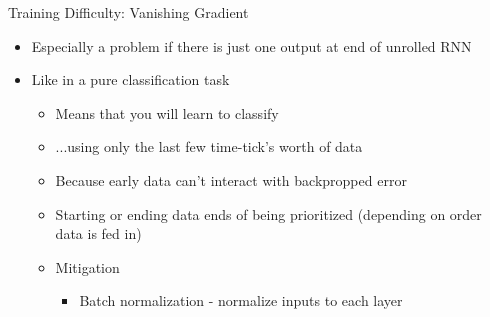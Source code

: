 \documentclass[aspectratio=169]{beamer}
\begin{document}
\begin{frame}{Training Difficulty: Vanishing Gradient}

\begin{itemize}
	\item Especially a problem if there is just one output at end of unrolled RNN
	\item Like in a pure classification task
	\begin{itemize}
	\item Means that you will learn to classify
	\item ...using only the last few time-tick's worth of data
	\item Because early data can't interact with backpropped error
	\item Starting or ending data ends of being prioritized (depending on order data is fed in)
	\item Mitigation
		\begin{itemize}
		\item Batch normalization - normalize inputs to each layer
		\end{itemize}
	\end{itemize}
\end{itemize}

\end{frame}
\end{document}
